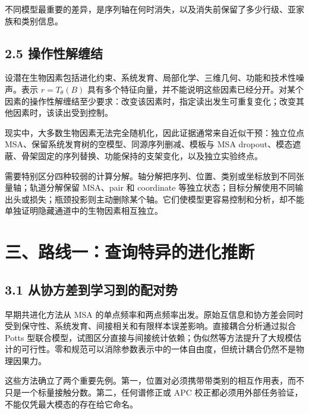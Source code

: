 \documentclass[10pt]{article}
\begin{document}
不同模型最重要的差异，是序列轴在何时消失，以及消失前保留了多少行级、亚家族和类别信息。\par

\subsection*{2.5 操作性解缠结}


设潜在生物因素包括进化约束、系统发育、局部化学、三维几何、功能和技术性噪声。表示 \(r=T_\theta(B)\) 具有多个特征向量，并不能说明这些因素已经分开。对某个因素的操作性解缠结至少要求：改变该因素时，指定读出发生可重复变化；改变其他因素时，该读出受到控制。\par

现实中，大多数生物因素无法完全随机化，因此证据通常来自近似干预：独立位点 MSA、保留系统发育树的空模型、同源序列删减、模板与 MSA dropout、模态遮蔽、骨架固定的序列替换、功能保持的支架变化，以及独立实验终点。\par

需要特别区分四种较弱的计算分解。轴分解把序列、位置、类别或坐标放到不同张量轴；轨道分解保留 MSA、pair 和 coordinate 等独立状态；目标分解使用不同输出头或损失；瓶颈投影则主动删除某个轴。它们使模型更容易控制和分析，却不能单独证明隐藏通道中的生物因素相互独立。\par

\section*{三、路线一：查询特异的进化推断}


\subsection*{3.1 从协方差到学习到的配对势}


早期共进化方法从 MSA 的单点频率和两点频率出发。原始互信息和协方差会同时受到保守性、系统发育、间接相关和有限样本误差影响。直接耦合分析通过拟合 Potts 型联合模型，试图区分直接与间接统计依赖；伪似然等方法提升了大规模估计的可行性。零和规范可以消除参数表示中的一体自由度，但统计耦合仍然不是物理因果力。\par

这些方法确立了两个重要先例。第一，位置对必须携带带类别的相互作用表，而不只是一个标量接触分数。第二，任何谱修正或 APC 校正都必须用外部任务验证，不能仅凭最大模态的存在给它命名。\par
\end{document}

